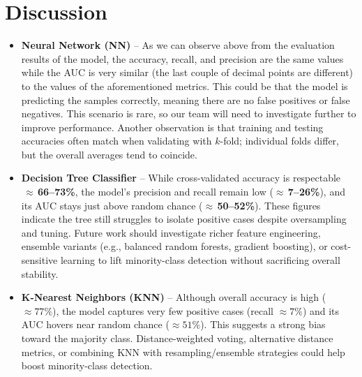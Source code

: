 \documentclass[11pt,a4paper]{article}
\begin{document}
\section{Discussion}
\begin{itemize}
    \item \textbf{Neural Network (NN)} – As we can observe above from the evaluation
          results of the model, the accuracy, recall,
          and precision are the same values while the AUC is very similar
          (the last couple of decimal points are different) to the values
          of the aforementioned metrics. This
          could be that the model is predicting the samples correctly, meaning
          there are no false positives or false negatives. This
          scenario is rare, so our team will need to investigate further to improve performance.
          Another observation is that training and testing accuracies often match when validating with \(k\)-fold;
          individual folds differ, but the overall averages tend to coincide.
    \item \textbf{Decision Tree Classifier} – While cross-validated accuracy is respectable
          $\,\approx$\,\textbf{66--73\%},
          the model’s precision and recall remain low ($\approx$\,\textbf{7--26\%}), and its AUC stays just above random chance
          ($\approx$\,\textbf{50--52\%}). These figures indicate the tree still struggles to isolate positive cases despite oversampling and tuning. Future work should investigate richer feature engineering, ensemble variants (e.g., balanced random forests, gradient boosting), or cost-sensitive learning to lift minority-class detection without sacrificing overall stability.
    \item \textbf{K-Nearest Neighbors (KNN)} – Although overall accuracy is high ($\approx 77\%$), the model captures very few positive cases (recall $\approx 7\%$) and its AUC hovers near random chance ($\approx 51\%$). This suggests a strong bias toward the majority class. Distance-weighted voting, alternative distance metrics, or combining KNN with resampling/ensemble strategies could help boost minority-class detection.
\end{itemize}
\end{document}

